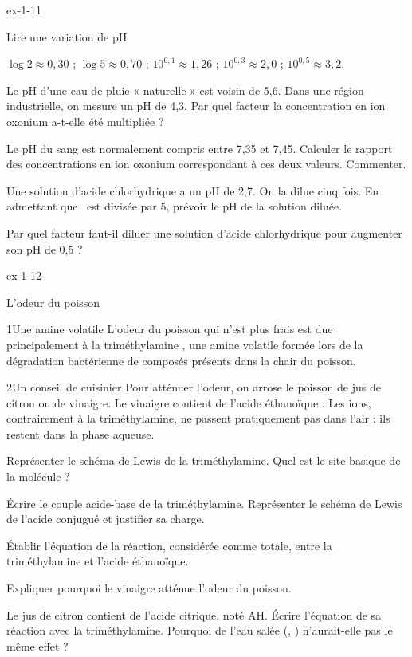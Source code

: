 \begin{blocLivre}{ex-1-11}
\begin{exercice}[2]{Lire une variation de pH}
\begin{donnees}
$\log2\approx0{,}30$ ; $\log5\approx0{,}70$ ; $10^{0{,}1}\approx1{,}26$ ; $10^{0{,}3}\approx2{,}0$ ; $10^{0{,}5}\approx3{,}2$.
\end{donnees}
\begin{questions}
\item Le pH d'une eau de pluie « naturelle » est voisin de 5,6. Dans une région industrielle, on mesure
un pH de 4,3. Par quel facteur la concentration en ion oxonium a-t-elle été multipliée ?
\item Le pH du sang est normalement compris entre 7,35 et 7,45. Calculer le rapport des concentrations
en ion oxonium correspondant à ces deux valeurs. Commenter.
\item Une solution d'acide chlorhydrique a un pH de 2,7. On la dilue cinq fois. En admettant que \hho\
est divisée par 5, prévoir le pH de la solution diluée.
\item Par quel facteur faut-il diluer une solution d'acide chlorhydrique pour augmenter son pH de 0,5 ?
\end{questions}
\end{exercice}
\end{blocLivre}
\begin{blocLivre}{ex-1-12}
\begin{exercice}[3]{L'odeur du poisson}
\begin{docu}{1}{Une amine volatile}
L'odeur du poisson qui n'est plus frais est due principalement à la triméthylamine ,
une amine volatile formée lors de la dégradation bactérienne de composés présents dans la chair du poisson.
\end{docu}
\begin{docu}{2}{Un conseil de cuisinier}
Pour atténuer l'odeur, on arrose le poisson de jus de citron ou de vinaigre. Le vinaigre contient
de l'acide éthanoïque \ce{CH3COOH}. Les ions, contrairement à la triméthylamine, ne passent
pratiquement pas dans l'air : ils restent dans la phase aqueuse.
\end{docu}
\begin{questions}
\item Représenter le schéma de Lewis de la triméthylamine. Quel est le site basique de la molécule ?
\item Écrire le couple acide-base de la triméthylamine. Représenter le schéma de Lewis de l'acide conjugué
et justifier sa charge.
\item Établir l'équation de la réaction, considérée comme totale, entre la triméthylamine et l'acide éthanoïque.
\item Expliquer pourquoi le vinaigre atténue l'odeur du poisson.
\item Le jus de citron contient de l'acide citrique, noté AH. Écrire l'équation de sa réaction avec la
triméthylamine. Pourquoi de l'eau salée (\ce{Na+}, \ce{Cl-}) n'aurait-elle pas le même effet ?
\end{questions}
\end{exercice}
\end{blocLivre}
